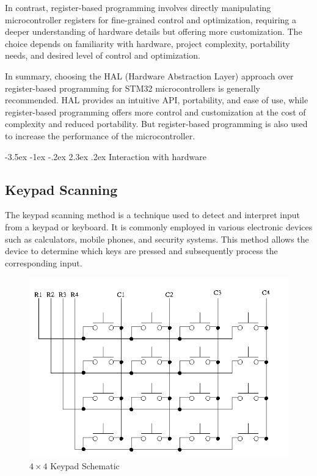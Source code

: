 \documentclass[a4paper, twoside]{report}
\makeatletter
\renewcommand\section{\@startsection {section}{1}{-1em}%
  {-3.5ex \@plus -1ex \@minus -.2ex}%
  {2.3ex \@plus.2ex}%
  {\normalfont\Large\bfseries}}
\makeatother
\begin{document}
In contrast, register-based programming involves directly manipulating microcontroller registers for fine-grained control and optimization, requiring a deeper understanding of hardware details but offering more customization. The choice depends on familiarity with hardware, project complexity, portability needs, and desired level of control and optimization.

In summary, choosing the HAL (Hardware Abstraction Layer) approach over register-based programming for STM32 microcontrollers is generally recommended. HAL provides an intuitive API, portability, and ease of use, while register-based programming offers more control and customization at the cost of complexity and reduced portability. But register-based programming is also used to increase the performance of the microcontroller.

\section{Interaction with hardware}
\subsection{Keypad Scanning}
The keypad scanning method is a technique used to detect and interpret input from a keypad or keyboard. It is commonly employed in various electronic devices such as calculators, mobile phones, and security systems. This method allows the device to determine which keys are pressed and subsequently process the corresponding input.

\begin{figure}[H] %
    \centering
    \includegraphics[width=.9\textwidth]{images/keypad.png}
    \caption{$4\times 4$ Keypad Schematic}
\end{figure}
\end{document}
